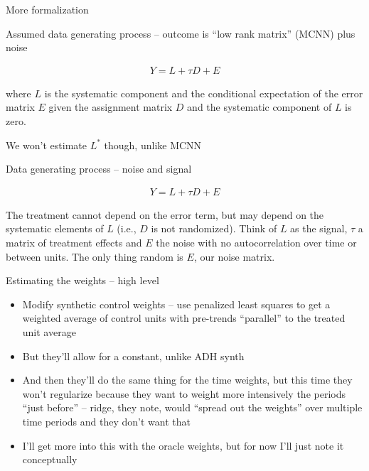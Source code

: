 \documentclass{beamer}
\begin{document}
\begin{frame}{More formalization}


Assumed data generating process -- outcome is ``low rank matrix'' (MCNN) plus noise

\bigskip


\begin{eqnarray*}
Y = L + \tau D  + E
\end{eqnarray*}

\bigskip

where $L$ is the systematic component and the conditional expectation of the error matrix $E$ given the assignment matrix $D$ and the systematic component of $L$ is zero.  

\bigskip

We won't estimate $L^*$ though, unlike MCNN

\end{frame}


\begin{frame}{Data generating process -- noise and signal}

\begin{eqnarray*}
Y = L + \tau D  + E
\end{eqnarray*}

\bigskip

The treatment cannot depend on the error term, but may depend on the systematic elements of $L$ (i.e., $D$ is not randomized). Think of $L$ as the signal, $\tau$ a matrix of treatment effects and $E$ the noise with no autocorrelation over time or between units. The only thing random is $E$, our noise matrix.

\end{frame}

\begin{frame}{Estimating the weights -- high level}

\begin{itemize}
\item Modify synthetic control weights -- use penalized least squares to get a weighted average of control units with pre-trends ``parallel'' to the treated unit average
\item But they'll allow for a constant, unlike ADH synth
\item And then they'll do the same thing for the time weights, but this time they won't regularize because they want to weight more intensively the periods ``just before'' -- ridge, they note, would ``spread out the weights'' over multiple time periods and they don't want that
\item I'll get more into this with the oracle weights, but for now I'll just note it conceptually
\end{itemize}

\end{frame}
\end{document}

